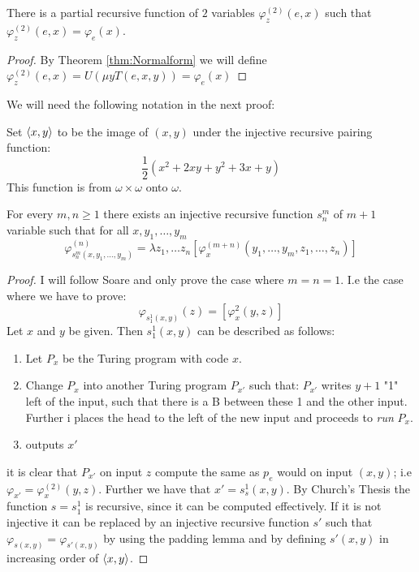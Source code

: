 \documentclass[../main.tex]{subfiles}
\begin{document}
\begin{thm}
	\label{thm:Emu}
	There is a partial recursive function of $2$ variables
	$\varphi_z^{(2)}(e,x)$ such that $\varphi_z^{(2)}(e,x)=\varphi_e(x)$.
\end{thm}
\begin{proof}
	By Theorem \ref{thm:Normalform} we will define
	$\varphi_z^{(2)}(e,x)=U(\mu y T(e,x,y))=\varphi_e(x)$
\end{proof}
We will need the following notation in the next proof:
\begin{defi}
	Set $\langle x,y\rangle$ to be the image of $(x,y)$ under the injective
	recursive  pairing function:
	$$\frac{1}{2}(x^2+2xy+y^2+3x+y)$$
	This function is from $\omega\times\omega$ onto $\omega$.
\end{defi}
\begin{thm}[s-m-n theorem]
	For every $m,n\geq 1$ there exists an injective recursive function
	$s_n^m$ of $m+1$ variable such that for all $x,y_1,\ldots,y_m$
	$$\varphi^{(n)}_{s^m_n(x,y_1,\ldots,y_m)}=\lambda z_1,\ldots
	z_n[\varphi^{(m+n)}_x(y_1,\ldots,y_m,z_1,\ldots,z_n)]$$
\end{thm}
\begin{proof}
	I will follow Soare and only prove the case where $m=n=1$. I.e the case
	where we have to prove:
	\[\varphi_{s^1_1(x,y)}(z)=[\varphi_x^{2}(y,z)]\]
	Let $x$ and $y$ be given. Then $s^1_1(x,y)$ can be described as
	follows:
	\begin{enumerate}
		\item Let $P_x$ be the Turing program with code $x$.
		\item Change $P_x$ into another Turing program $P_{x'}$ such
			that: $P_{x'}$ writes $y+1$ "1" left of the input, such
			that there is a B between these 1 and the other input.
			Further i places the head to the left of the new input
			and proceeds to \textit{run} $P_x$.
		\item outputs $x'$
	\end{enumerate}
	it is clear that $P_{x'}$ on input $z$ compute the same as $p_e$ would
	on input $(x,y)$; i.e $\varphi_{x'}=\varphi_x^{(2)}(y,z)$. Further we
	have that $x'=s^1_s(x,y)$.
	By Church's Thesis the function $s=s^1_1$ is recursive, since it can be
	computed effectively. If it is not injective it can be replaced by an
	injective recursive function $s'$ such that
	$\varphi_{s(x,y)}=\varphi_{s'(x,y)}$ by using the padding lemma and by
	defining $s'(x,y)$ in increasing order of $\langle x,y\rangle$.
\end{proof}
\end{document}
